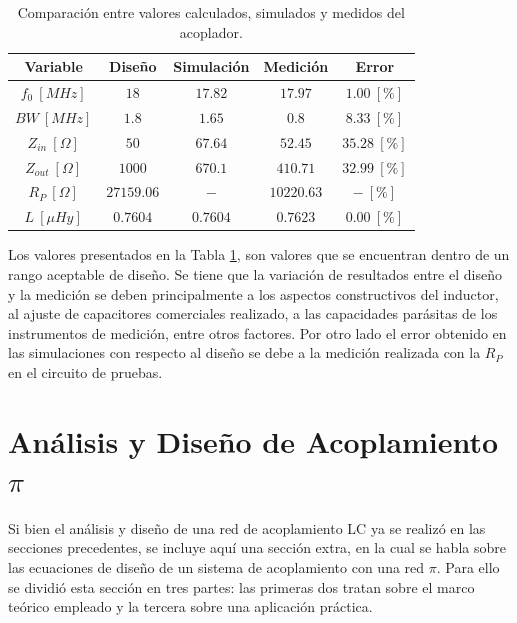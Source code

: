 \documentclass[conference]{IEEEtran}
\begin{document}
\begin{table}[htbp]
    \caption{Comparación entre valores calculados, simulados y medidos del acoplador.}
    \centering
    \begin{tabular}{|c|c|c|c|c|} \hline
         \textbf{Variable} & \textbf{Diseño} & \textbf{Simulación} & \textbf{Medición} & \textbf{Error} \\ \hline
         $f_{0} \ [MHz]$      & $18$       & $17.82$  & $17.97$    & $1.00 \ [\%]$     \\ \hline
         $BW \ [MHz]$         & $1.8$      & $1.65$   & $0.8$      & $8.33  \ [\%]$ \\ \hline
         $Z_{in} \ [\Omega]$  & $50$       & $67.64$  & $52.45$    & $35.28 \ [\%]$ \\ \hline
         $Z_{out} \ [\Omega]$ & $1000$     & $670.1$  & $410.71$   & $32.99\ [\%]$ \\ \hline
         $R_{P}\ [\Omega]$    & $27159.06$ & $-$      & $10220.63$ & $- \ [\%]$ \\ \hline
         $L \ [\mu Hy]$       & $0.7604$   & $0.7604$ & $0.7623$   & $0.00 \ [\%]$ \\ \hline
    \end{tabular}
    \label{tab:tab_1}
\end{table}

Los valores presentados en la Tabla \ref{tab:tab_1}, son valores que se encuentran dentro de un rango aceptable de diseño. Se tiene que la variación de resultados entre el diseño y la medición se deben principalmente a los aspectos constructivos del inductor, al ajuste de capacitores comerciales realizado, a las capacidades parásitas de los instrumentos de medición, entre otros factores. Por otro lado el error obtenido en las simulaciones con respecto al diseño se debe a la medición realizada con la $R_{P}$ en el circuito de pruebas.



\section{Análisis y Diseño de Acoplamiento $\pi$}
Si bien el análisis y diseño de una red de acoplamiento LC ya se realizó en las secciones precedentes, se incluye aquí una sección extra, en la cual se habla sobre las ecuaciones de diseño de un sistema de acoplamiento con una red $\pi$. Para ello se dividió esta sección en tres partes: las primeras dos tratan sobre el marco teórico empleado y la tercera sobre una aplicación práctica.
\end{document}
